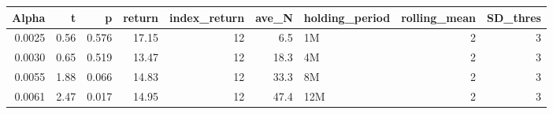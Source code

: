 \begin{table}[ht]
\centering
\begin{tabular}{rrrrrrlrr}
  \hline
Alpha & t & p & return & index\_return & ave\_N & holding\_period & rolling\_mean & SD\_thres \\ 
  \hline
0.0025 & 0.56 & 0.576 & 17.15 & 12 & 6.5 & 1M &  2 &  3 \\ 
  0.0030 & 0.65 & 0.519 & 13.47 & 12 & 18.3 & 4M &  2 &  3 \\ 
  0.0055 & 1.88 & 0.066 & 14.83 & 12 & 33.3 & 8M &  2 &  3 \\ 
  0.0061 & 2.47 & 0.017 & 14.95 & 12 & 47.4 & 12M &  2 &  3 \\ 
   \hline
\end{tabular}
\end{table}

